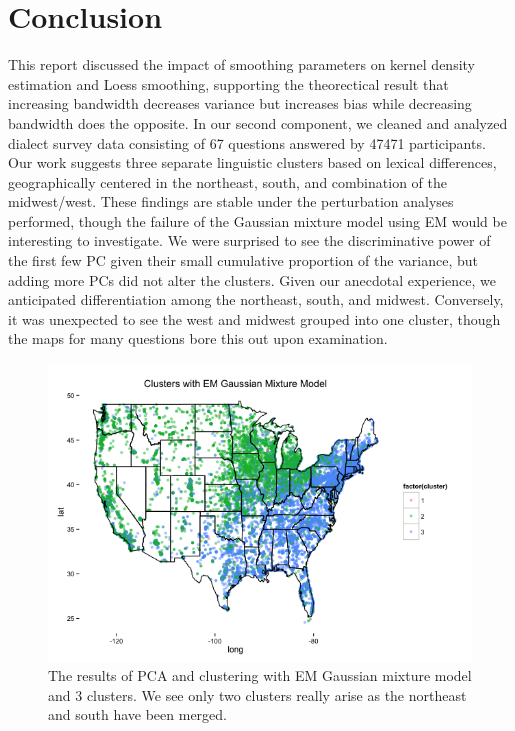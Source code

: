 \documentclass[english]{article}\usepackage{graphicx, color}
\numberwithin{equation}{section}
\numberwithin{figure}{section}
\begin{document}
\section{Conclusion}
This report discussed the impact of smoothing parameters on kernel density estimation and Loess smoothing, supporting the theorectical result that increasing bandwidth decreases variance but increases bias while decreasing bandwidth does the opposite. In our second component, we cleaned and analyzed dialect survey data consisting of 67 questions answered by 47471 participants. Our work suggests three separate linguistic clusters based on lexical differences, geographically centered in the northeast, south, and combination of the midwest/west. These findings are stable under the perturbation analyses performed, though the failure of the Gaussian mixture model using EM would be interesting to investigate. We were surprised to see the discriminative power of the first few PC given their small cumulative proportion of the variance, but adding more PCs did not alter the clusters. Given our anecdotal experience, we anticipated differentiation among the northeast, south, and midwest. Conversely, it was unexpected to see the west and midwest grouped into one cluster, though the maps for many questions bore this out upon examination. 

\begin{figure}
\begin{center}
\includegraphics[scale=.5]{EMclusters.png}
\end{center}
\caption{The results of PCA and clustering with EM Gaussian mixture model and 3 clusters. We see only two clusters really arise as the northeast and south have been merged.}
\end{figure}
\end{document}
